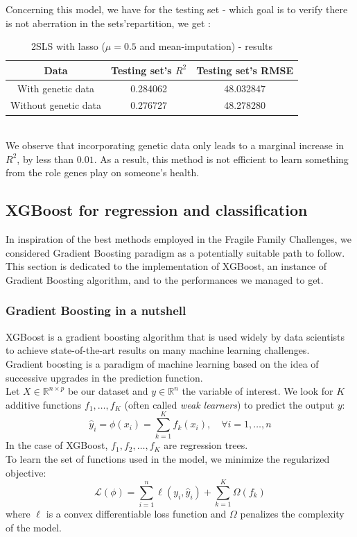 \documentclass[]{article}
\begin{document}
\noindent
Concerning this model, we have for the testing set - which goal is to verify there is not aberration in the sets'repartition, we get : 
\begin{table}[!h]
	\centering
	\begin{tabular}{|c|c|c|}
		\hline
		\textbf{Data} & \textbf{Testing set's $R^2$} & \textbf{Testing set's RMSE} \\
		\hline
		With genetic data & 0.284062 & 48.032847  \\ 
		\hline
		Without genetic data & 0.276727 & 48.278280 \\
		\hline 
	\end{tabular}
	\caption{2SLS with lasso ($\mu = 0.5$ and mean-imputation) - results}
	\label{results_2SLS}
\end{table}\\
We observe that incorporating genetic data only leads to a marginal increase in $R^2$, by less than $0.01$. As a result, this method is not efficient to learn something from the role genes play on someone's health.
\subsection{XGBoost for regression and classification}
In inspiration of the best methods employed in the Fragile Family Challenges, we considered Gradient Boosting paradigm as a potentially suitable path to follow. This section is dedicated to the implementation of XGBoost, an instance of Gradient Boosting algorithm, and to the performances we managed to get.
\subsubsection{Gradient Boosting in a nutshell}
XGBoost \cite{xgboost2016} is a gradient boosting algorithm that is used widely by data scientists to achieve state-of-the-art results on many machine learning challenges.\\
Gradient boosting is a paradigm of machine learning based on the idea of successive upgrades in the prediction function.\\

\noindent
Let $X\in \mathbb{R}^{n\times p}$ be our dataset and $y\in \mathbb{R}^n$ the variable of interest. We look for $K$ additive functions $f_1,\dots,f_K$ (often called \textit{weak learners}) to predict the output $y$:
\begin{equation}
	\hat{y}_i = \phi(x_i) = \sum_{k=1}^K f_k(x_i),\quad \forall i=1, \dots, n
\end{equation}
In the case of XGBoost, $f_1,f_2,\dots,f_K$ are regression trees.\\
To learn the set of functions used in the model, we minimize the regularized objective:
\begin{equation}
	\label{xgboost_objective}
	\mathcal{L}(\phi) = \sum_{i=1}^n \ell(y_i, \hat{y}_i) + \sum_{k=1}^K\Omega(f_k)
\end{equation}
where $\ell$ is a convex differentiable loss function and $\Omega$ penalizes the complexity of the model.\\
\end{document}
